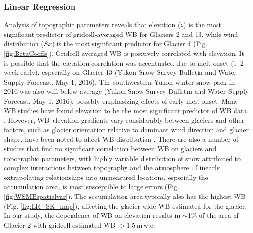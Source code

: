 \documentclass[twocolumn, letterpaper]{igs}
\begin{document}
\subsubsection{Linear Regression}

Analysis of topographic parameters reveals that elevation ($z$) is the most significant predictor of gridcell-averaged WB for Glaciers 2 and 13, while wind distribution ($Sx$) is the most significant predictor for Glacier 4 (Fig. \ref{fig:BetaCoeffs}). Gridcell-averaged WB is positively correlated with elevation. It is possible that the elevation correlation was accentuated due to melt onset (1--2 week early), especially on Glacier 13 (Yukon Snow Survey Bulletin and Water Supply Forecast, May 1, 2016). The southwestern Yukon winter snow pack in 2016 was also well below average (Yukon Snow Survey Bulletin and Water Supply Forecast, May 1, 2016), possibly emphasizing effects of early melt onset. Many WB studies have found elevation to be the most significant predictor of WB data \citep[e.g.][]{Machguth2006, McGrath2015}. However, WB--elevation gradients vary considerably between glaciers \citep[e.g.][]{Winther1998} and other factors, such as glacier orientation relative to dominant wind direction and glacier shape, have been noted to affect WB distribution \citep{Machguth2006,Grabiec2011}. There are also a number of studies that find no significant correlation between WB on glaciers and topographic parameters, with highly variable distribution of snow attributed to complex interactions between topography and the atmosphere \citep[e.g.][]{Grabiec2011,Lopez2011}. Linearly extrapolating relationships into unmeasured locations, especially the accumulation area, is most susceptible to large errors (Fig. \ref{fig:WSMBspatialvar}). The accumulation area typically also has the highest WB (Fig. \ref{fig:LR_SK_map}), affecting the glacier-wide WB estimated for the glacier. In our study, the dependence of WB on elevation results in $\sim$1\% of the area of Glacier 2 with gridcell-estimated WB $>$1.5\,m\,w.e. 
\end{document}
